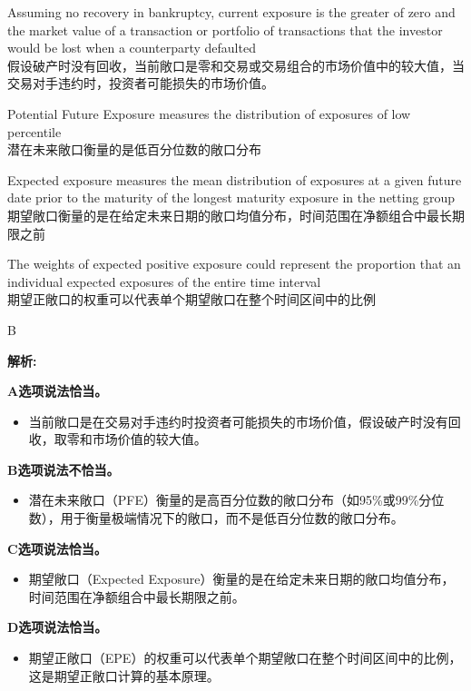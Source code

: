 \documentclass{article}
\newenvironment{explanation}
{\textbf{解析:}\par}
{\par}
\begin{document}
\begin{choices}
    \item Assuming no recovery in bankruptcy, current exposure is the greater of zero and the market value of a transaction or portfolio of transactions that the investor would be lost when a counterparty defaulted\\
    假设破产时没有回收，当前敞口是零和交易或交易组合的市场价值中的较大值，当交易对手违约时，投资者可能损失的市场价值。
    \item Potential Future Exposure measures the distribution of exposures of low percentile\\
    潜在未来敞口衡量的是低百分位数的敞口分布
    \item Expected exposure measures the mean distribution of exposures at a given future date prior to the maturity of the longest maturity exposure in the netting group\\
    期望敞口衡量的是在给定未来日期的敞口均值分布，时间范围在净额组合中最长期限之前
    \item The weights of expected positive exposure could represent the proportion that an individual expected exposures of the entire time interval\\
    期望正敞口的权重可以代表单个期望敞口在整个时间区间中的比例
\end{choices}

\begin{correctanswer}
    B
\end{correctanswer}

\begin{explanation}
    \textbf{A选项说法恰当。}
    \begin{itemize}
        \item 当前敞口是在交易对手违约时投资者可能损失的市场价值，假设破产时没有回收，取零和市场价值的较大值。
    \end{itemize}

    \textbf{B选项说法不恰当。}
    \begin{itemize}
        \item 潜在未来敞口（PFE）衡量的是高百分位数的敞口分布（如95\%或99\%分位数），用于衡量极端情况下的敞口，而不是低百分位数的敞口分布。
    \end{itemize}

    \textbf{C选项说法恰当。}
    \begin{itemize}
        \item 期望敞口（Expected Exposure）衡量的是在给定未来日期的敞口均值分布，时间范围在净额组合中最长期限之前。
    \end{itemize}

    \textbf{D选项说法恰当。}
    \begin{itemize}
        \item 期望正敞口（EPE）的权重可以代表单个期望敞口在整个时间区间中的比例，这是期望正敞口计算的基本原理。
    \end{itemize}
\end{explanation}
\end{document}
